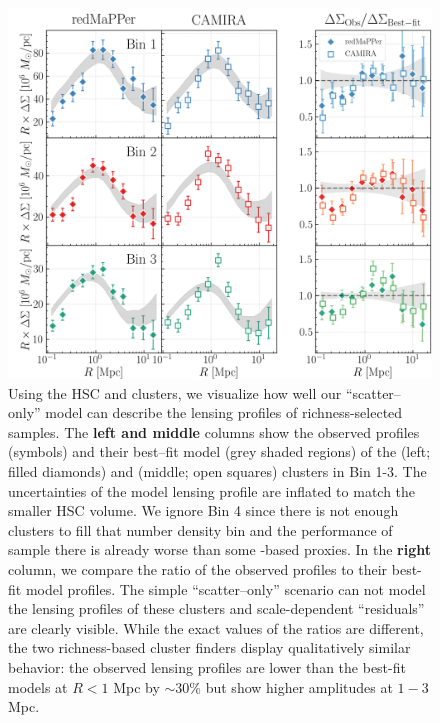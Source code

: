 \documentclass[fleqn,usenatbib,useAMS,english]{mnras}
\begin{document}
  \begin{figure}
      \centering
      \includegraphics[width=\textwidth]{figure/topn_fig_11}
      \caption{
          Using the HSC \redm{} and \camira{} clusters, we visualize how well our
          ``scatter--only'' model can describe the lensing profiles of richness-selected \topn{}
          samples.
          The \textbf{left and middle} columns show the observed \rdsigma{} profiles (symbols)
          and their best--fit model (grey shaded regions) of the \redm{} (left; filled diamonds)
          and \camira{} (middle; open squares) clusters in Bin 1-3.
          The uncertainties of the model lensing profile are inflated to match the smaller
          HSC volume.
          We ignore Bin 4 since there is not enough \camira{} clusters to fill that number
          density bin and the performance of \redm{} sample there is already worse than some
          \mstar{}-based \mvir{} proxies.
          In the \textbf{right} column, we compare the ratio of the observed \dsigma{} profiles
          to their best-fit model profiles.
          The simple ``scatter--only'' scenario can not model the lensing profiles of these
          clusters and scale-dependent ``residuals'' are clearly visible.
          While the exact values of the ratios are different, the two richness-based cluster
          finders display qualitatively similar behavior: the observed lensing profiles are lower
          than the best-fit models at $R<1$ Mpc by $\sim 30$\% but show higher amplitudes at
          $1-3$ Mpc.
      }
      \label{fig:richness_residual}
  \end{figure}
\end{document}
